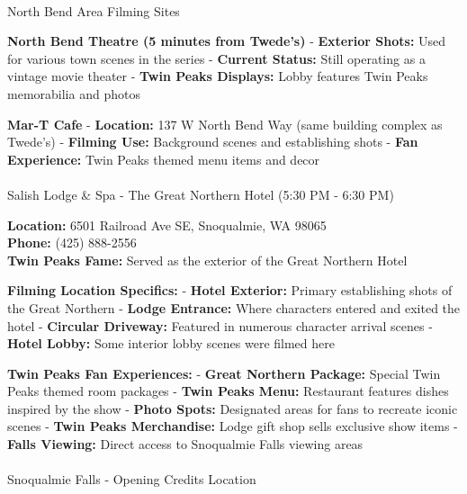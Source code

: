 \documentclass[
  11pt,
  letterpaper,
  DIV=10,
  numbers=noendperiod]{scrartcl}
\makeatletter
\let\oldparagraph\paragraph
\renewcommand{\paragraph}{
    \@ifstar
      \xxxParagraphStar
      \xxxParagraphNoStar
  }
\newcommand{\xxxParagraphStar}[1]{\oldparagraph*{#1}\mbox{}}
\newcommand{\xxxParagraphNoStar}[1]{\oldparagraph{#1}\mbox{}}
\makeatother
\begin{document}
\paragraph{North Bend Area Filming
Sites}\label{north-bend-area-filming-sites}

\textbf{North Bend Theatre (5 minutes from Twede's)} - \textbf{Exterior
Shots:} Used for various town scenes in the series - \textbf{Current
Status:} Still operating as a vintage movie theater - \textbf{Twin Peaks
Displays:} Lobby features Twin Peaks memorabilia and photos

\textbf{Mar-T Cafe} - \textbf{Location:} 137 W North Bend Way (same
building complex as Twede's) - \textbf{Filming Use:} Background scenes
and establishing shots - \textbf{Fan Experience:} Twin Peaks themed menu
items and decor

\paragraph{Salish Lodge \& Spa - The Great Northern Hotel (5:30 PM -
6:30
PM)}\label{salish-lodge-spa---the-great-northern-hotel-530-pm---630-pm}

\textbf{Location:} 6501 Railroad Ave SE, Snoqualmie, WA 98065\\
\textbf{Phone:} (425) 888-2556\\
\textbf{Twin Peaks Fame:} Served as the exterior of the Great Northern
Hotel

\textbf{Filming Location Specifics:} - \textbf{Hotel Exterior:} Primary
establishing shots of the Great Northern - \textbf{Lodge Entrance:}
Where characters entered and exited the hotel - \textbf{Circular
Driveway:} Featured in numerous character arrival scenes - \textbf{Hotel
Lobby:} Some interior lobby scenes were filmed here

\textbf{Twin Peaks Fan Experiences:} - \textbf{Great Northern Package:}
Special Twin Peaks themed room packages - \textbf{Twin Peaks Menu:}
Restaurant features dishes inspired by the show - \textbf{Photo Spots:}
Designated areas for fans to recreate iconic scenes - \textbf{Twin Peaks
Merchandise:} Lodge gift shop sells exclusive show items - \textbf{Falls
Viewing:} Direct access to Snoqualmie Falls viewing areas

\paragraph{Snoqualmie Falls - Opening Credits
Location}\label{snoqualmie-falls---opening-credits-location}
\end{document}
